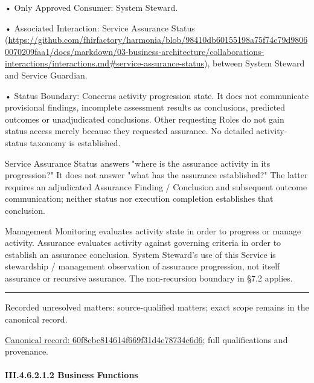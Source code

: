 •
Only Approved Consumer: System Steward.



•
Associated Interaction: Service Assurance Status (\url{https://github.com/fhirfactory/harmonia/blob/98410db60155198a75f74c79d98060070209faa1/docs/markdown/03-business-architecture/collaborations-interactions/interactions.md#service-assurance-status}), between System Steward and Service Guardian.



•
Status Boundary: Concerns activity progression state. It does not communicate provisional findings, incomplete assessment results as conclusions, predicted outcomes or unadjudicated conclusions. Other requesting Roles do not gain status access merely because they requested assurance. No detailed activity-status taxonomy is established.



Service Assurance Status answers "where is the assurance activity in its progression?" It does not answer "what has the assurance established?" The latter requires an adjudicated Assurance Finding / Conclusion and subsequent outcome communication; neither status nor execution completion establishes that conclusion.



Management Monitoring evaluates activity state in order to progress or manage activity. Assurance evaluates activity against governing criteria in order to establish an assurance conclusion. System Steward's use of this Service is stewardship / management observation of assurance progression, not itself assurance or recursive assurance. The non-recursion boundary in §7.2 applies.



\medskip\hrule\medskip

{\small Recorded unresolved matters: source-qualified matters; exact scope remains in the canonical record.}\par
{\footnotesize \href{../../../../../../../continuum/business/business-service/60f8cbc814614f669f31d4e78734c6d6.md}{Canonical record: 60f8cbc814614f669f31d4e78734c6d6}; full qualifications and provenance.}\par
\paragraph*{III.4.6.2.1.2 Business Functions}
\label{navigation:III.4.6.2.1.2}

